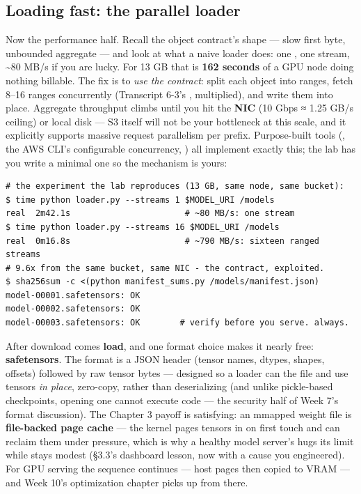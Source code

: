 \subsection*{Loading fast: the parallel loader}

Now the performance half. Recall the object contract's shape — slow first byte, unbounded aggregate — and look at what a naive loader does: one , one stream, \textasciitilde{}80 MB/s if you are lucky. For 13 GB that is \textbf{162 seconds} of a GPU node doing nothing billable. The fix is to \textit{use the contract}: split each object into ranges, fetch 8–16 ranges concurrently (Transcript 6-3's , multiplied), and write them into place. Aggregate throughput climbs until you hit the \textbf{NIC} (10 Gbps ≈ 1.25 GB/s ceiling) or local disk — S3 itself will not be your bottleneck at this scale, and it explicitly supports massive request parallelism per prefix. Purpose-built tools (, the AWS CLI's configurable concurrency, ) all implement exactly this; the lab has you write a minimal one so the mechanism is yours:

\begin{terminalbox}
\begin{Verbatim}[breaklines=true,breakanywhere=true,fontsize=\small,formatcom=\color{tbbtermfg},codes=\tbbcodeactive]
# the experiment the lab reproduces (13 GB, same node, same bucket):
$ time python loader.py --streams 1 $MODEL_URI /models
real  2m42.1s                       # ~80 MB/s: one stream
$ time python loader.py --streams 16 $MODEL_URI /models
real  0m16.8s                       # ~790 MB/s: sixteen ranged streams
# 9.6x from the same bucket, same NIC - the contract, exploited.
$ sha256sum -c <(python manifest_sums.py /models/manifest.json)
model-00001.safetensors: OK
model-00002.safetensors: OK
model-00003.safetensors: OK        # verify before you serve. always.
\end{Verbatim}
\end{terminalbox}

After download comes \textbf{load}, and one format choice makes it nearly free: \textbf{safetensors}. The format is a JSON header (tensor names, dtypes, shapes, offsets) followed by raw tensor bytes — designed so a loader can  the file and use tensors \textit{in place}, zero-copy, rather than deserializing (and unlike pickle-based checkpoints, opening one cannot execute code — the security half of Week 7's format discussion). The Chapter 3 payoff is satisfying: an mmapped weight file is \textbf{file-backed page cache} — the kernel pages tensors in on first touch and can reclaim them under pressure, which is why a healthy model server's  hugs its limit while  stays modest (§3.3's dashboard lesson, now with a cause you engineered). For GPU serving the sequence continues — host pages then copied to VRAM — and Week 10's optimization chapter picks up from there.

